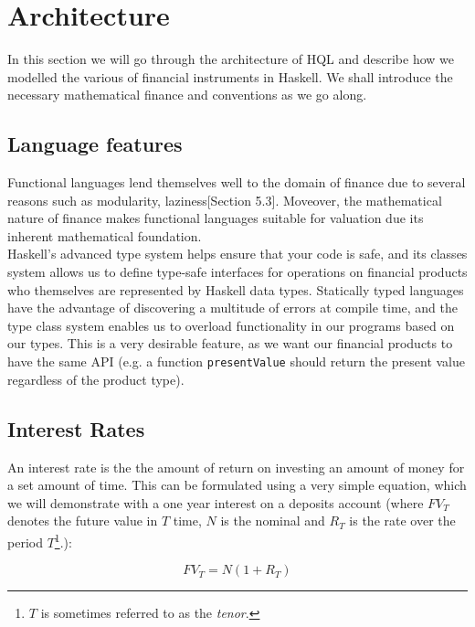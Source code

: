 \chapter{Architecture}

In this section we will go through the architecture of HQL and describe how we
modelled the various of financial instruments in Haskell. We shall introduce
the necessary mathematical finance and conventions as we go along.

\section{Language features}

Functional languages lend themselves well to the domain of finance due
to several reasons such as modularity\cite{hughes:matters-cj}, 
laziness\cite{composingcontracts}[Section 5.3]. Moveover, the mathematical
 nature of finance makes functional languages suitable for valuation due its
inherent mathematical foundation.\\

Haskell's advanced type system helps ensure that your code is safe, and its 
classes system allows us to define type-safe interfaces for operations on 
financial products who themselves are represented by Haskell data types. 
Statically typed languages have the advantage of discovering a multitude of
errors at compile time, and the type class system enables us to overload 
functionality in our programs based on our types. This is a very desirable
feature, as we want our financial products to have the same API (e.g. a function 
\texttt{presentValue} should return the present value regardless of the product 
type).\\

\section{Interest Rates}

An interest rate is the the amount of return on investing an amount of money 
for a set amount of time. This can be formulated using a very simple equation, 
which we will demonstrate with a one year interest on a deposits account (where
$FV_T$ denotes the future value in $T$ time, $N$ is the nominal and $R_T$ is the
rate over the period $T$\footnote{$T$ is sometimes referred to as the
\emph{tenor}.}.):

\begin{equation}
FV_T = N (1 + R_T)
\end{equation}


